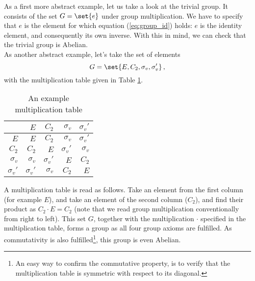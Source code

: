         As a first more abstract example, let us take a look at the trivial group. It consists of the set $G = \set{e}$ under group multiplication. We have to specify that $e$ is the element for which equation (\ref{eq:group_id}) holds: $e$ is the identity element, and consequently its own inverse. With this in mind, we can check that the trivial group is Abelian. \\

        As another abstract example, let's take the set of elements
        \begin{equation}
            G = \set{E, C_2, \sigma_v, \sigma_v'} \thinspace ,
        \end{equation}
        with the multiplication table given in Table \ref{table:multiplication_table_C2v}.
        \begin{table}[H] \centering
            \begin{tabular}{r|rrrr}
                            & $E$           & $C_2$         & $\sigma_v$    & $\sigma_v'$   \\ \hline

                $E$         & $E$           & $C_2$         & $\sigma_v$    & $\sigma_v'$   \\
                $C_2$       & $C_2$         & $E$           & $\sigma_v'$   & $\sigma_v$    \\
                $\sigma_v$  & $\sigma_v$    & $\sigma_v'$   & $E$           & $C_2$         \\
                $\sigma_v'$ & $\sigma_v'$   & $\sigma_v$    & $C_2$         & $E$
            \end{tabular}
            \caption{An example multiplication table}
            \label{table:multiplication_table_C2v}
        \end{table}
        A multiplication table is read as follows. Take an element from the first column (for example $E$), and take an element of the second column ($C_2$), and find their product as $C_2 \cdot E = C_2$ (note that we read group multiplication conventionally from right to left). This set $G$, together with the multiplication $\cdot$ specified in the multiplication table, forms a group as all four group axioms are fulfilled. As commutativity is also fulfilled\footnote{An easy way to confirm the commutative property, is to verify that the multiplication table is symmetric with respect to its diagonal.}, this group is even Abelian. \\

